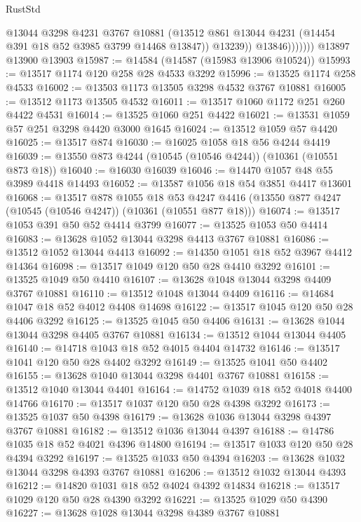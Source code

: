 \begin{lexlean}{RustStd}
\begin{coremodule}
                      @13044
                      @3298
                      @4231
                      @3767
                      @10881
                      (@13512 @861 @13044 @4231 (@14454 @391 @18 @52 @3985 @3799 @14468 @13847))
                      @13239))
                  @13846)))))))
    @13897
    @13900
    @13903
@15987 := @14584 (@14587 (@15983 @13906 @10524))
@15993 := @13517 @1174 @120 @258 @28 @4533 @3292
@15996 := @13525 @1174 @258 @4533
@16002 := @13503 @1173 @13505 @3298 @4532 @3767 @10881
@16005 := @13512 @1173 @13505 @4532
@16011 := @13517 @1060 @1172 @251 @260 @4422 @4531
@16014 := @13525 @1060 @251 @4422
@16021 := @13531 @1059 @57 @251 @3298 @4420 @3000 @1645
@16024 := @13512 @1059 @57 @4420
@16025 := @13517 @874
@16030 := @16025 @1058 @18 @56 @4244 @4419
@16039 := @13550 @873 @4244 (@10545 (@10546 @4244)) (@10361 (@10551 @873 @18))
@16040 := @16030 @16039
@16046 := @14470 @1057 @48 @55 @3989 @4418 @14493
@16052 := @13587 @1056 @18 @54 @3851 @4417 @13601
@16068 := @13517
    @878
    @1055
    @18
    @53
    @4247
    @4416
    (@13550 @877 @4247 (@10545 (@10546 @4247)) (@10361 (@10551 @877 @18)))
@16074 := @13517 @1053 @391 @50 @52 @4414 @3799
@16077 := @13525 @1053 @50 @4414
@16083 := @13628 @1052 @13044 @3298 @4413 @3767 @10881
@16086 := @13512 @1052 @13044 @4413
@16092 := @14350 @1051 @18 @52 @3967 @4412 @14364
@16098 := @13517 @1049 @120 @50 @28 @4410 @3292
@16101 := @13525 @1049 @50 @4410
@16107 := @13628 @1048 @13044 @3298 @4409 @3767 @10881
@16110 := @13512 @1048 @13044 @4409
@16116 := @14684 @1047 @18 @52 @4012 @4408 @14698
@16122 := @13517 @1045 @120 @50 @28 @4406 @3292
@16125 := @13525 @1045 @50 @4406
@16131 := @13628 @1044 @13044 @3298 @4405 @3767 @10881
@16134 := @13512 @1044 @13044 @4405
@16140 := @14718 @1043 @18 @52 @4015 @4404 @14732
@16146 := @13517 @1041 @120 @50 @28 @4402 @3292
@16149 := @13525 @1041 @50 @4402
@16155 := @13628 @1040 @13044 @3298 @4401 @3767 @10881
@16158 := @13512 @1040 @13044 @4401
@16164 := @14752 @1039 @18 @52 @4018 @4400 @14766
@16170 := @13517 @1037 @120 @50 @28 @4398 @3292
@16173 := @13525 @1037 @50 @4398
@16179 := @13628 @1036 @13044 @3298 @4397 @3767 @10881
@16182 := @13512 @1036 @13044 @4397
@16188 := @14786 @1035 @18 @52 @4021 @4396 @14800
@16194 := @13517 @1033 @120 @50 @28 @4394 @3292
@16197 := @13525 @1033 @50 @4394
@16203 := @13628 @1032 @13044 @3298 @4393 @3767 @10881
@16206 := @13512 @1032 @13044 @4393
@16212 := @14820 @1031 @18 @52 @4024 @4392 @14834
@16218 := @13517 @1029 @120 @50 @28 @4390 @3292
@16221 := @13525 @1029 @50 @4390
@16227 := @13628 @1028 @13044 @3298 @4389 @3767 @10881

\end{coremodule}
\end{lexlean}
